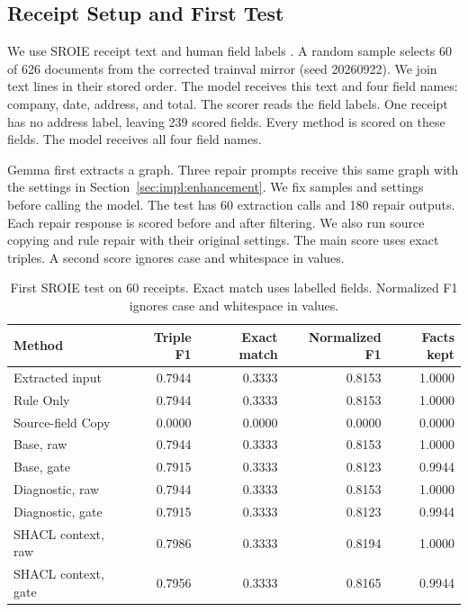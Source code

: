 \subsection{Receipt Setup and First Test}
\label{sec:eval:external_receipts}

We use SROIE receipt text and human field labels \citep{ref_sroie2019}.
A random sample selects 60 of 626 documents from the corrected trainval
mirror (seed 20260922). We join text lines in their stored order.
The model receives this text and four field names: company, date, address,
and total. The scorer reads the field labels.
One receipt has no address label, leaving 239 scored fields.
Every method is scored on these fields.
The model receives all four field names.

Gemma first extracts a graph. Three repair prompts receive this same graph
with the settings in Section~\ref{sec:impl:enhancement}.
We fix samples and settings before calling the model.
The test has 60 extraction calls and 180 repair outputs.
Each repair response is scored before and after filtering.
We also run source copying and rule repair with their original settings.
The main score uses exact triples. A second score ignores case and
whitespace in values.

\begin{table}[t]
\centering
\caption{First SROIE test on 60 receipts. Exact match uses labelled fields. Normalized F1 ignores case and whitespace in values.}
\label{tab:external_receipts}
\small
\begin{tabular}{lrrrr}
\toprule
Method & Triple F1 & Exact match & Normalized F1 & Facts kept \\
\midrule
Extracted input & 0.7944 & 0.3333 & 0.8153 & 1.0000 \\
Rule Only & 0.7944 & 0.3333 & 0.8153 & 1.0000 \\
Source-field Copy & 0.0000 & 0.0000 & 0.0000 & 0.0000 \\
Base, raw & 0.7944 & 0.3333 & 0.8153 & 1.0000 \\
Base, gate & 0.7915 & 0.3333 & 0.8123 & 0.9944 \\
Diagnostic, raw & 0.7944 & 0.3333 & 0.8153 & 1.0000 \\
Diagnostic, gate & 0.7915 & 0.3333 & 0.8123 & 0.9944 \\
SHACL context, raw & 0.7986 & 0.3333 & 0.8194 & 1.0000 \\
SHACL context, gate & 0.7956 & 0.3333 & 0.8165 & 0.9944 \\
\bottomrule
\end{tabular}
\end{table}

